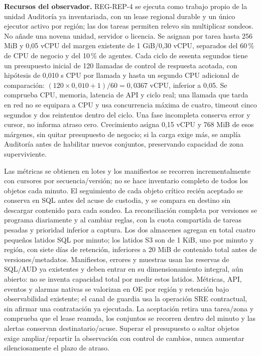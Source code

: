 \textbf{Recursos del observador.} REG-REP-4 se ejecuta como trabajo propio de la unidad Auditoría ya inventariada, con un lease regional durable y un único ejecutor activo por región; las dos tareas permiten relevo sin multiplicar sondeos. No añade una novena unidad, servidor o licencia. Se asignan por tarea hasta 256 MiB y 0,05 vCPU del margen existente de 1 GiB/0,30 vCPU, separados del 60\,\% de CPU de negocio y del 10\,\% de agentes. Cada ciclo de sesenta segundos tiene un presupuesto inicial de 120 llamadas de control de respuesta acotada, con hipótesis de 0,010 s CPU por llamada y hasta un segundo CPU adicional de comparación: $(120\times0,010+1)/60=0,0367$ vCPU, inferior a 0,05. Se comprueba CPU, memoria, latencia de API y ciclo real; una llamada que tarda en red no se equipara a CPU y usa concurrencia máxima de cuatro, timeout cinco segundos y dos reintentos dentro del ciclo. Una fase incompleta conserva error y cursor, no informa atraso cero. Crecimiento asigna 0,15 vCPU y 768 MiB de esos márgenes, sin quitar presupuesto de negocio; si la carga exige más, se amplía Auditoría antes de habilitar nuevos conjuntos, preservando capacidad de zona superviviente.

Las métricas se obtienen en lotes y los manifiestos se recorren incrementalmente con cursores por secuencia/versión; no se hace inventario completo de todos los objetos cada minuto. El seguimiento de cada objeto crítico recién aceptado se conserva en SQL antes del acuse de custodia, y se compara en destino sin descargar contenido para cada sondeo. La reconciliación completa por versiones se programa diariamente y al cambiar reglas, con la cuota compartida de tareas pesadas y prioridad inferior a captura. Los dos almacenes agregan en total cuatro pequeños latidos SQL por minuto; los latidos S3 son de 1 KiB, uno por minuto y región, con siete días de retención, inferiores a 20 MiB de contenido total antes de versiones/metadatos. Manifiestos, errores y muestras usan las reservas de SQL/AUD ya existentes y deben entrar en su dimensionamiento integral, aún abierto: no se inventa capacidad total por medir estos latidos. Métricas, API, eventos y alarmas nativas se valorizan en OE por región y retención bajo observabilidad existente; el canal de guardia usa la operación SRE contractual, sin afirmar una contratación ya ejecutada. La aceptación retira una tarea/zona y comprueba que el lease reanuda, los conjuntos se recorren dentro del minuto y las alertas conservan destinatario/acuse. Superar el presupuesto o saltar objetos exige ampliar/repartir la observación con control de cambios, nunca aumentar silenciosamente el plazo de atraso.

